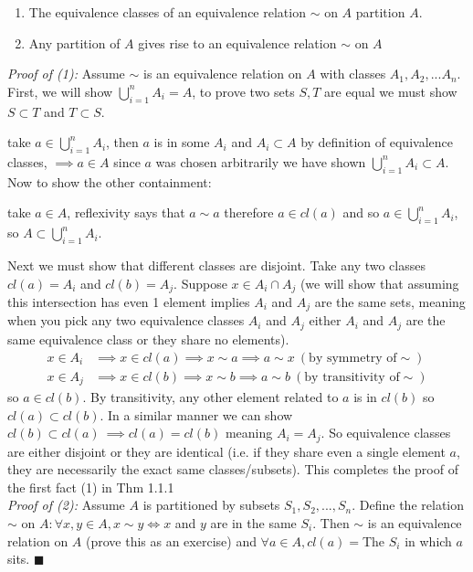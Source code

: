 \begin{theorem}                           \hspace{0.4in}
\begin{enumerate}
    \item The equivalence classes of an equivalence relation $\sim$ on $A$ partition $A$.
    \item Any partition of $A$ gives rise to an equivalence relation $\sim$ on $A$
\end{enumerate}
\steezybreak
\textit{Proof of (1):} Assume $\sim$ is an equivalence relation on $A$ with classes
$A_1,A_2,...A_n$. First, we will show $\bigcup_{i=1}^n A_i=A$, to prove two sets $S,T$ are equal we
must show $S\subset T$ and $T\subset S$.\steezybreak

\noindent take $a\in \bigcup_{i=1}^n A_i$, then $a$ is in some $A_i$ and $A_i\subset A$ by
definition of equivalence classes, $\implies a \in A$ since $a$ was chosen arbitrarily we have shown
$\bigcup_{i=1}^n A_i \subset A$. Now to show the other containment:\steezybreak

\noindent take $a\in A$, reflexivity says that $a\sim a$ therefore $a\in cl(a)$ and so
$a\in \bigcup_{i=1}^n A_i$, so $A\subset \bigcup_{i=1}^n A_i$.\steezybreak

Next we must show that different classes are disjoint. Take any two classes $cl(a)=A_i$ and
$cl(b)=A_j$. Suppose $x\in A_i\cap A_j$ (we will show that assuming this intersection has even 1
element implies $A_i$ and $A_j$  are the same sets, meaning  when you pick any two equivalence
classes $A_i$ and $A_j$ either $A_i$ and $A_j$ are the same equivalence class or they share no
elements).
\begin{align}
    x\in A_i &\implies x\in cl(a) \implies x\sim a \implies a\sim x \ (\text{by symmetry of} \sim) \nonumber\\
    x\in A_j &\implies x\in cl(b) \implies x\sim b \implies a\sim b \ (\text{by transitivity of} \sim) \nonumber
\end{align}
so $a\in cl(b)$. By transitivity, any other element related to $a$ is in $cl(b)$ so
$cl(a)\subset cl(b)$. In a similar manner we can show $cl(b)\subset cl(a) \ \implies cl(a)=cl(b)$
meaning $A_i=A_j$. So equivalence classes are either disjoint or they are identical (i.e. if they
share even a single element $a$, they are necessarily the exact same classes/subsets). This
completes the proof of the first fact (1) in Thm 1.1.1 \steezybreak \\

\noindent\textit{Proof of (2):} Assume $A$ is partitioned by subsets $S_1,S_2,...,S_n$. Define the
relation $\sim$ on $A: \forall x,y \in A, x\sim y \iff x$ and $y$ are in the same $S_i$. Then $\sim$
is an equivalence relation on $A$ (prove this as an exercise) and $\forall a \in A, cl(a)=$The $S_i$
in which $a$ sits.
$\blacksquare$
\end{theorem}



